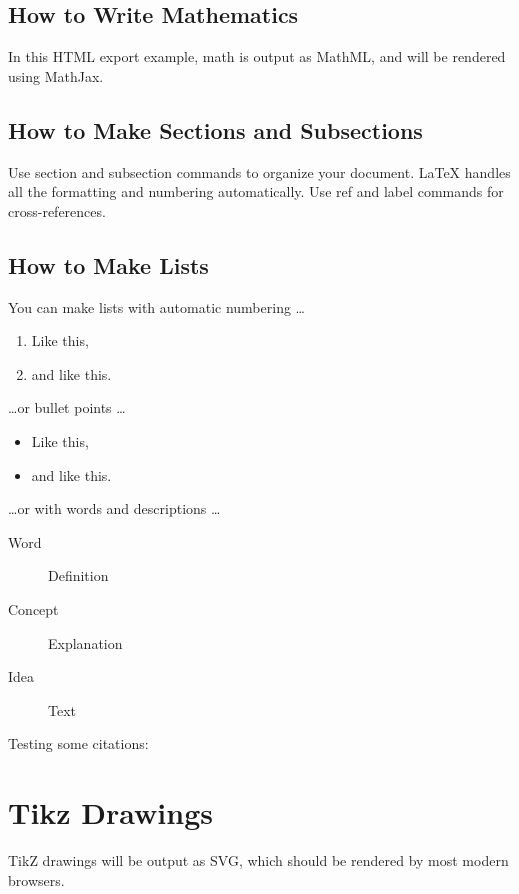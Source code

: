 \subsection{How to Write Mathematics}


In this HTML export example, math is output as MathML, and will be rendered using MathJax.

\subsection{How to Make Sections and Subsections}

Use section and subsection commands to organize your document. \LaTeX{} handles all the formatting and numbering automatically. Use ref and label commands for cross-references.

\subsection{How to Make Lists}

You can make lists with automatic numbering \dots

\begin{enumerate}
\item Like this,
\item and like this.
\end{enumerate}
\dots or bullet points \dots
\begin{itemize}
\item Like this,
\item and like this.
\end{itemize}
\dots or with words and descriptions \dots
\begin{description}
\item[Word] Definition
\item[Concept] Explanation
\item[Idea] Text
\end{description}

Testing some citations: \cite{NTLKProject2015,Bond2014}

\section{Tikz Drawings}

TikZ drawings will be output as SVG, which should be rendered by most modern browsers.



